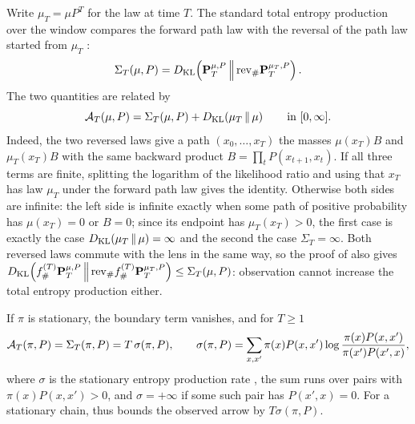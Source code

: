 \begin{remark}\label{rem:entropy_production}
Write $\mu_T=\mu P^T$ for the law at time $T$.
The standard total entropy production over the window compares the forward path law with the reversal of the path law started from $\mu_T$ \citep{Seifert2012,MaesNetocny2003}:
\[
  \Sigma_T(\mu,P)=D_{\mathrm{KL}}\!\left(\mathbf{P}^{\mu,P}_T\,\middle\|\,\mathrm{rev}_{\#}\mathbf{P}^{\mu_T,P}_T\right).
\]
The two quantities are related by
\[
  \mathcal{A}_T(\mu,P)=\Sigma_T(\mu,P)+D_{\mathrm{KL}}\!\left(\mu_T\,\middle\|\,\mu\right)\qquad\text{in }[0,\infty].
\]
Indeed, the two reversed laws give a path $(x_0,\dots,x_T)$ the masses $\mu(x_T)B$ and $\mu_T(x_T)B$ with the same backward product $B=\prod_tP(x_{t+1},x_t)$.
If all three terms are finite, splitting the logarithm of the likelihood ratio and using that $x_T$ has law $\mu_T$ under the forward path law gives the identity.
Otherwise both sides are infinite: the left side is infinite exactly when some path of positive probability has $\mu(x_T)=0$ or $B=0$; since its endpoint has $\mu_T(x_T)>0$, the first case is exactly the case $D_{\mathrm{KL}}\!\left(\mu_T\,\middle\|\,\mu\right)=\infty$ and the second the case $\Sigma_T=\infty$.
Both reversed laws commute with the lens in the same way, so the proof of \thmNGArrowDPI{} also gives
$D_{\mathrm{KL}}\!\left(f^{(T)}_{\#}\mathbf{P}^{\mu,P}_T\,\middle\|\,\mathrm{rev}_{\#}f^{(T)}_{\#}\mathbf{P}^{\mu_T,P}_T\right)\le\Sigma_T(\mu,P)$: observation cannot increase the total entropy production either.

If $\pi$ is stationary, the boundary term vanishes, and for $T\ge 1$
\[
  \mathcal{A}_T(\pi,P)=\Sigma_T(\pi,P)=T\,\sigma(\pi,P),\qquad
  \sigma(\pi,P)=\sum_{x,x'}\pi(x)P(x,x')\log\frac{\pi(x)P(x,x')}{\pi(x')P(x',x)},
\]
where $\sigma$ is the stationary entropy production rate \citep{Schnakenberg1976,Seifert2012}, the sum runs over pairs with $\pi(x)P(x,x')>0$, and $\sigma=+\infty$ if some such pair has $P(x',x)=0$.
For a stationary chain, \thmNGArrowDPI{} thus bounds the observed arrow by $T\sigma(\pi,P)$.
\end{remark}
